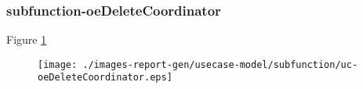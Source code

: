 \subsubsection{subfunction-oeDeleteCoordinator}

\label{RE-use-case-oeDeleteCoordinator}


Figure \ref{fig:lu.uni.lassy.excalibur.examples.icrash-RE-UCD-uc-oeDeleteCoordinator}

\begin{figure}[htbp]
\begin{center}

\texttt{[image: ./images-report-gen/usecase-model/subfunction/uc-oeDeleteCoordinator.eps]}
\end{center}
\caption[lu.uni.lassy.excalibur.examples.icrash Use Case Diagram: uc-oeDeleteCoordinator]{}
\label{fig:lu.uni.lassy.excalibur.examples.icrash-RE-UCD-uc-oeDeleteCoordinator}
\end{figure}
\vspace{0.5cm}
